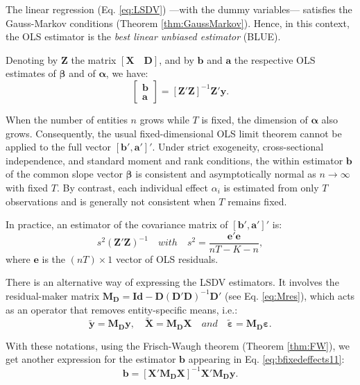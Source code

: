 \documentclass[
  11pt,
]{book}
\theoremstyle{definition}
\theoremstyle{definition}
\theoremstyle{definition}
\theoremstyle{definition}
\theoremstyle{remark}
\begin{document}
The linear regression (Eq. \eqref{eq:LSDV}) ---with the dummy variables--- satisfies the Gauss-Markov conditions (Theorem \ref{thm:GaussMarkov}). Hence, in this context, the OLS estimator is the \emph{best linear unbiased estimator} (BLUE).

Denoting by \(\mathbf{Z}\) the matrix \([\mathbf{X} \quad \mathbf{D}]\), and by \(\mathbf{b}\) and \(\mathbf{a}\) the respective OLS estimates of \(\boldsymbol\beta\) and of \(\boldsymbol\alpha\), we have:
\begin{equation}
\boxed{
\left[
\begin{array}{c}
\mathbf{b}\\
\mathbf{a}
\end{array}
\right]
= [\mathbf{Z}'\mathbf{Z}]^{-1}\mathbf{Z}'\mathbf{y}.} \label{eq:bfixedeffects11}
\end{equation}

When the number of entities \(n\) grows while \(T\) is fixed, the dimension of \(\boldsymbol\alpha\) also grows. Consequently, the usual fixed-dimensional OLS limit theorem cannot be applied to the full vector \([\mathbf{b}',\mathbf{a}']'\). Under strict exogeneity, cross-sectional independence, and standard moment and rank conditions, the within estimator \(\mathbf{b}\) of the common slope vector \(\boldsymbol\beta\) is consistent and asymptotically normal as \(n\rightarrow\infty\) with fixed \(T\). By contrast, each individual effect \(\alpha_i\) is estimated from only \(T\) observations and is generally not consistent when \(T\) remains fixed.

In practice, an estimator of the covariance matrix of \([\mathbf{b}',\mathbf{a}']'\) is:
\[
s^2 \left( \mathbf{Z}'\mathbf{Z}\right)^{-1} \quad with \quad s^2 = \frac{\mathbf{e}'\mathbf{e}}{nT - K - n},
\]
where \(\mathbf{e}\) is the \((nT) \times 1\) vector of OLS residuals.

There is an alternative way of expressing the LSDV estimators. It involves the residual-maker matrix \(\mathbf{M_D}=\mathbf{Id} - \mathbf{D}(\mathbf{D}'\mathbf{D})^{-1}\mathbf{D}'\) (see Eq. \eqref{eq:Mres}), which acts as an operator that removes entity-specific means, i.e.:
\[
\tilde{\mathbf{y}} = \mathbf{M_D}\mathbf{y}, \quad \tilde{\mathbf{X}} = \mathbf{M_D}\mathbf{X} \quad and \quad \tilde{\boldsymbol\varepsilon} = \mathbf{M_D}\boldsymbol\varepsilon.
\]

With these notations, using the Frisch-Waugh theorem (Theorem \ref{thm:FW}), we get another expression for the estimator \(\mathbf{b}\) appearing in Eq. \eqref{eq:bfixedeffects11}:
\begin{equation}
\boxed{\mathbf{b} = [\mathbf{X}'\mathbf{M_D}\mathbf{X}]^{-1}\mathbf{X}'\mathbf{M_D}\mathbf{y}.}\label{eq:bfixedeffects}
\end{equation}
\end{document}
